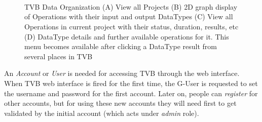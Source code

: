  \begin{figure}[!htbp]
 	\centering
	\\
	\\
	\\
	\caption{TVB Data Organization
	(A) View all Projects
	(B) 2D graph display of Operations with their input and output DataTypes 
	(C) View all Operations in current project with their status, duration, results, etc
	(D) DataType details and further available operations for it. This menu becomes available after clicking a DataType result from several places in TVB }
        \label{fig:project}
\end{figure}

 An \emph{Account} or \emph{User} is needed for accessing  TVB through the web interface. 
 When TVB web interface is fired for the first time, the G-User is requested to set the username and password for the first account.
Later on, people can \emph{register} for other accounts, but for using these new accounts they will need first to get validated by the 
initial account (which acts under \emph{admin} role).

